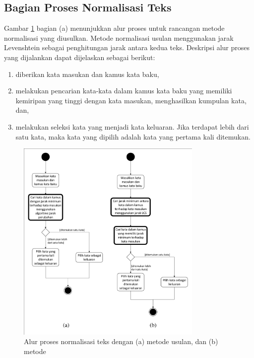 \subsection{Bagian Proses Normalisasi Teks}

Gambar \ref{fig:side_to_side} bagian (a) menunjukkan alur proses untuk rancangan metode normalisasi yang diusulkan. Metode normalisasi usulan menggunakan jarak Levenshtein sebagai penghitungan jarak antara kedua teks. Deskripsi alur proses yang dijalankan dapat dijelaskan sebagai berikut:
\begin{enumerate}
	\item diberikan kata masukan dan kamus kata baku,
	\item melakukan pencarian kata-kata dalam kamus kata baku yang memiliki kemiripan yang tinggi dengan kata masukan, menghasilkan kumpulan kata, dan,
	\item melakukan seleksi kata yang menjadi kata keluaran. Jika terdapat lebih dari satu kata, maka kata yang dipilih adalah kata yang pertama kali ditemukan.
\end{enumerate}
\begin{figure}[ht]
	\centering
	\includegraphics[width=0.8\textwidth, trim=2 2 2 2, clip]{resources/3/side_to_side.pdf}
	\caption{Alur proses normalisasi teks dengan (a) metode usulan, dan (b) metode \parencite{saragih2017normalisasi}}
	\label{fig:side_to_side}
\end{figure}

